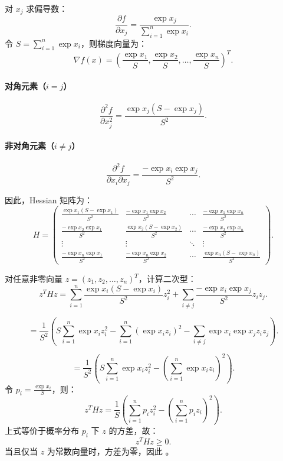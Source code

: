 对 \( x_j \) 求偏导数：
\[
\frac{\partial f}{\partial x_j} = \frac{\exp x_j}{\sum_{i=1}^n \exp x_i}.
\]
令 \( S = \sum_{i=1}^n \exp x_i \)，则梯度向量为：
\[
\nabla f(x) = \left( \frac{\exp x_1}{S}, \frac{\exp x_2}{S}, \dots, \frac{\exp x_n}{S} \right)^T.
\]

\paragraph{对角元素（\( i = j \)）}
\[
\frac{\partial^2 f}{\partial x_j^2} = \frac{\exp x_j (S - \exp x_j)}{S^2}.
\]

\paragraph{非对角元素（\( i \neq j \)）}
\[
\frac{\partial^2 f}{\partial x_i \partial x_j} = \frac{-\exp x_i \exp x_j}{S^2}.
\]

因此，Hessian 矩阵为：
\[
H = \begin{pmatrix}
\frac{\exp x_1(S - \exp x_1)}{S^2} & \frac{-\exp x_1 \exp x_2}{S^2} & \cdots & \frac{-\exp x_1 \exp x_n}{S^2} \\
\frac{-\exp x_2 \exp x_1}{S^2} & \frac{\exp x_2(S - \exp x_2)}{S^2} & \cdots & \frac{-\exp x_2 \exp x_n}{S^2} \\
\vdots & \vdots & \ddots & \vdots \\
\frac{-\exp x_n \exp x_1}{S^2} & \frac{-\exp x_n \exp x_2}{S^2} & \cdots & \frac{\exp x_n(S - \exp x_n)}{S^2}
\end{pmatrix}.
\]

对任意非零向量 \( z = (z_1, z_2, \dots, z_n)^T \)，计算二次型：
\[
z^T H z = \sum_{i=1}^n \frac{\exp x_i (S - \exp x_i)}{S^2} z_i^2 + \sum_{i \neq j} \frac{-\exp x_i \exp x_j}{S^2} z_i z_j.
\]

\[
= \frac{1}{S^2} \left( S \sum_{i=1}^n \exp x_i z_i^2 - \sum_{i=1}^n (\exp x_i z_i)^2 - \sum_{i \neq j} \exp x_i \exp x_j z_i z_j \right).
\]

\[
= \frac{1}{S^2} \left( S \sum_{i=1}^n \exp x_i z_i^2 - \left( \sum_{i=1}^n \exp x_i z_i \right)^2 \right).
\]
令 \( p_i = \frac{\exp x_i}{S} \)，则：
\[
z^T H z = \frac{1}{S} \left( \sum_{i=1}^n p_i z_i^2 - \left( \sum_{i=1}^n p_i z_i \right)^2 \right).
\]
上式等价于概率分布 \( p_i \) 下 \( z \) 的方差，故：
\[
z^T H z \geq 0.
\]
当且仅当 \( z \) 为常数向量时，方差为零，因此 。
